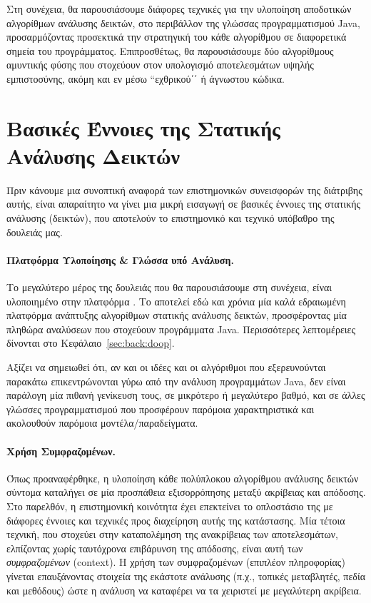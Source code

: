 Στη συνέχεια, θα παρουσιάσουμε διάφορες τεχνικές για την υλοποίηση αποδοτικών αλγορίθμων ανάλυσης δεικτών, στο περιβάλλον της γλώσσας προγραμματισμού {\en Java}, προσαρμόζοντας προσεκτικά την στρατηγική του κάθε αλγορίθμου σε διαφορετικά σημεία του προγράμματος. Επιπροσθέτως, θα παρουσιάσουμε δύο αλγορίθμους αμυντικής φύσης που στοχεύουν στον υπολογισμό αποτελεσμάτων υψηλής εμπιστοσύνης, ακόμη και εν μέσω ``εχθρικού΄΄ ή άγνωστου κώδικα.


\section*{Βασικές Έννοιες της Στατικής Ανάλυσης Δεικτών}

Πριν κάνουμε μια συνοπτική αναφορά των επιστημονικών συνεισφορών της διάτριβης αυτής, είναι απαραίτητο να γίνει μια μικρή εισαγωγή σε βασικές έννοιες της στατικής ανάλυσης (δεικτών), που αποτελούν το επιστημονικό και τεχνικό υπόβαθρο της δουλειάς μας.

\paragraph*{Πλατφόρμα Υλοποίησης \& Γλώσσα υπό Ανάλυση.}
Το μεγαλύτερο μέρος της δουλειάς που θα παρουσιάσουμε στη συνέχεια, είναι υλοποιημένο στην πλατφόρμα {\en \doop{}}\cite{oopsla:2009:Bravenboer}. Το {\en \doop{}} αποτελεί εδώ και χρόνια μία καλά εδραιωμένη πλατφόρμα ανάπτυξης αλγορίθμων στατικής ανάλυσης δεικτών, προσφέροντας μία πληθώρα αναλύσεων που στοχεύουν προγράμματα {\en Java}. Περισσότερες λεπτομέρειες δίνονται στο Κεφάλαιο~\ref{sec:back:doop}.

Αξίζει να σημειωθεί ότι, αν και οι ιδέες και οι αλγόριθμοι που εξερευνούνται παρακάτω επικεντρώνονται γύρω από την ανάλυση προγραμμάτων {\en Java}, δεν είναι παράλογη μία πιθανή γενίκευση τους, σε μικρότερο ή μεγαλύτερο βαθμό, και σε άλλες γλώσσες προγραμματισμού που προσφέρουν παρόμοια χαρακτηριστικά και ακολουθούν παρόμοια μοντέλα/παραδείγματα.


\paragraph*{Χρήση Συμφραζομένων.}
Όπως προαναφέρθηκε, η υλοποίηση κάθε πολύπλοκου αλγορίθμου ανάλυσης δεικτών σύντομα καταλήγει σε μία προσπάθεια εξισορρόπησης μεταξύ ακρίβειας και απόδοσης. Στο παρελθόν, η επιστημονική κοινότητα έχει επεκτείνει το οπλοστάσιο της με διάφορες έννοιες και τεχνικές προς διαχείρηση αυτής της κατάστασης. Μία τέτοια τεχνική, που στοχεύει στην καταπολέμηση της ανακρίβειας των αποτελεσμάτων, ελπίζοντας χωρίς ταυτόχρονα επιβάρυνση της απόδοσης, είναι αυτή των \emph{συμφραζομένων} ({\en context}). Η χρήση των συμφραζομένων (επιπλέον πληροφορίας) γίνεται επαυξάνοντας στοιχεία της εκάστοτε ανάλυσης (π.χ., τοπικές μεταβλητές, πεδία και μεθόδους) ώστε η ανάλυση να καταφέρει να τα χειριστεί με μεγαλύτερη ακρίβεια.

